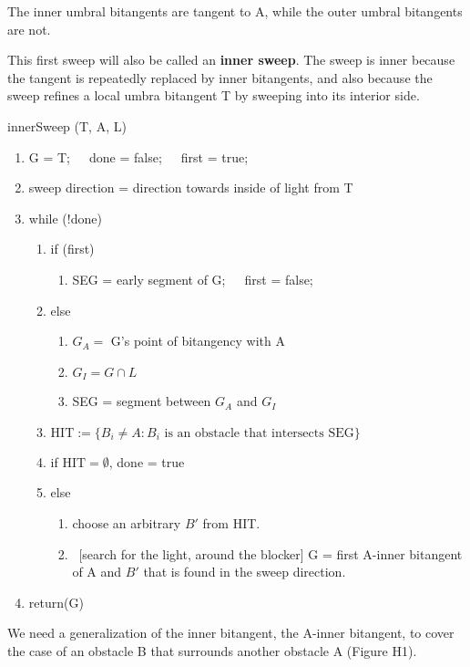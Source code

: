 \documentclass[12pt]{article}
\begin{document}
The inner umbral bitangents are tangent to A,
while the outer umbral bitangents are not.

\begin{defn2}
This first sweep will also be called an {\bf inner sweep}.
The sweep is inner because the tangent is repeatedly replaced by inner bitangents,
and also because the sweep refines a local umbra bitangent T
by sweeping into its interior side.
\end{defn2}

%
\centerline{innerSweep (T, A, L)}
\begin{enumerate}
\item 
	G = T;\ \ \ done = false;\ \ \ first = true;
\item 	
	sweep direction = direction towards inside of light from T
\item 
	while (!done)
\begin{enumerate}
\item   if (first)
\begin{enumerate}
\item	SEG = early segment of G;\ \ \ first = false;
\end{enumerate}
\item	else
\begin{enumerate}
\item	$G_A = $ G's point of bitangency with A
\item	$G_I = G \cap L$
\item	SEG = segment between $G_A$ and $G_I$
\end{enumerate}
\item 
	$\mbox{HIT} := \{B_i \neq A : B_i \mbox{ is an obstacle that intersects
	SEG} \}$
\item 
	if $\mbox{HIT} = \emptyset$, done = true
\item   
	else
\begin{enumerate}
\item
	choose an arbitrary $B'$ from HIT.
\item 
	\ [search for the light, around the blocker] 
	G = first A-inner bitangent of A and $B'$ that is found
	in the sweep direction.
\end{enumerate}
\end{enumerate}
\item	return(G)
\end{enumerate}

\begin{rmk}
We need a generalization of the inner bitangent, the A-inner bitangent,
to cover the case of an obstacle B that surrounds another obstacle A (Figure H1).
\end{rmk}
\end{document}
